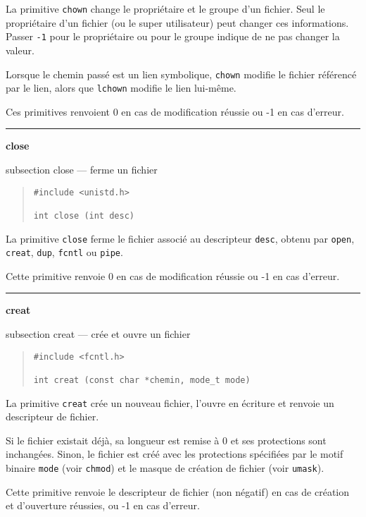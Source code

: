\documentclass [twoside] {report}
\newcommand {\primitive} [1]
    {
	\phantomsection
	{\large \textbf {#1}}
	\addcontentsline {toc} {subsection} {#1}
    }
\newcommand {\separation}
    {
	\vspace {5mm}
	\nopagebreak
	\hrule
    }
\begin{document}
La primitive \texttt {chown} change le propriétaire et le groupe d'un
fichier.  Seul le propriétaire d'un fichier (ou le super utilisateur)
peut changer ces informations.  Passer \texttt {-1} pour le propriétaire
ou pour le groupe indique de ne pas changer la valeur.

Lorsque le chemin passé est un lien symbolique, \texttt {chown} modifie
le fichier référencé par le lien, alors que \texttt {lchown} modifie
le lien lui-même.

Ces primitives renvoient 0 en cas de modification
réussie ou -1 en cas d'erreur.




\separation
\primitive {close} --- ferme un fichier

\begin {quote}
\begin {verbatim}
#include <unistd.h>

int close (int desc)
\end{verbatim}
\end {quote}

La primitive \texttt {close} ferme le fichier associé
au descripteur \texttt {desc}, obtenu par \texttt {open},
\texttt {creat}, \texttt {dup}, \texttt {fcntl} ou \texttt {pipe}.

Cette primitive renvoie 0 en cas de modification
réussie ou -1 en cas d'erreur.




\separation
\primitive {creat} --- crée et ouvre un fichier

\begin {quote}
\begin {verbatim}
#include <fcntl.h>

int creat (const char *chemin, mode_t mode)
\end{verbatim}
\end {quote}

La primitive \texttt {creat} crée un nouveau fichier,
l'ouvre en écriture et renvoie un descripteur de
fichier.

Si le fichier existait déjà, sa longueur est
remise à 0 et ses protections sont inchangées.
Sinon, le fichier est créé avec les protections
spécifiées par le motif binaire \texttt {mode} (voir
\texttt {chmod}) et le masque de création de fichier
(voir \texttt {umask}).

Cette primitive renvoie le descripteur de fichier
(non négatif) en cas de création et d'ouverture
réussies, ou -1 en cas d'erreur.
\end{document}
